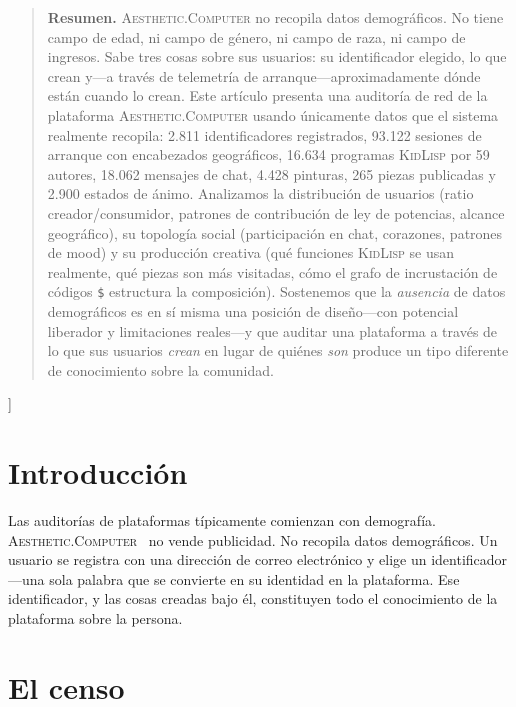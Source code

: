 \documentclass[10pt,letterpaper,twocolumn]{article}
\newcommand{\ac}{\textsc{Aesthetic.Computer}}
\newcommand{\kl}{\textsc{KidLisp}}
\begin{document}
{\begin{quote}
\small\noindent\textbf{Resumen.}
\ac{} no recopila datos demográficos. No tiene campo de edad, ni campo de género, ni campo de raza, ni campo de ingresos. Sabe tres cosas sobre sus usuarios: su identificador elegido, lo que crean y---a través de telemetría de arranque---aproximadamente dónde están cuando lo crean. Este artículo presenta una auditoría de red de la plataforma \ac{} usando únicamente datos que el sistema realmente recopila: 2.811 identificadores registrados, 93.122 sesiones de arranque con encabezados geográficos, 16.634 programas \kl{} por 59 autores, 18.062 mensajes de chat, 4.428 pinturas, 265 piezas publicadas y 2.900 estados de ánimo. Analizamos la distribución de usuarios (ratio creador/consumidor, patrones de contribución de ley de potencias, alcance geográfico), su topología social (participación en chat, corazones, patrones de mood) y su producción creativa (qué funciones \kl{} se usan realmente, qué piezas son más visitadas, cómo el grafo de incrustación de códigos \texttt{\$} estructura la composición). Sostenemos que la \emph{ausencia} de datos demográficos es en sí misma una posición de diseño---con potencial liberador y limitaciones reales---y que auditar una plataforma a través de lo que sus usuarios \emph{crean} en lugar de quiénes \emph{son} produce un tipo diferente de conocimiento sobre la comunidad.
\end{quote}
\vspace{0.5em}
}]

\section{Introducción}

Las auditorías de plataformas típicamente comienzan con demografía. \ac{}~\citep{scudder2026ac} no vende publicidad. No recopila datos demográficos. Un usuario se registra con una dirección de correo electrónico y elige un identificador---una sola palabra que se convierte en su identidad en la plataforma. Ese identificador, y las cosas creadas bajo él, constituyen todo el conocimiento de la plataforma sobre la persona.

\section{El censo}
\end{document}
